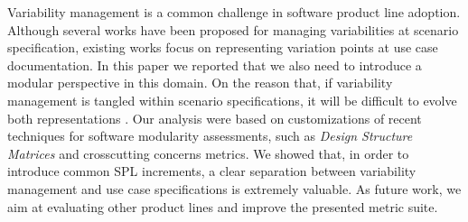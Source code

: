 \documentclass{acm_proc_article-sp}
\begin{document}
Variability management is a common challenge in software product line adoption. Although several 
works have been proposed for managing variabilities at scenario specification, existing works focus on 
representing variation points at use case documentation. In this paper we reported that we also need to 
introduce a modular perspective in this domain. On the reason that, if variability management is tangled within scenario 
specifications, it will be difficult to evolve both representations . Our analysis were based on customizations of recent techniques for software modularity assessments, such as \emph{Design Structure Matrices} and crosscutting concerns metrics. We showed that, in order to introduce common SPL increments, a clear separation between variability management and use case specifications is extremely valuable. As future work, we aim at evaluating other product lines and improve the presented metric suite. 

%

%
%
\end{document}
